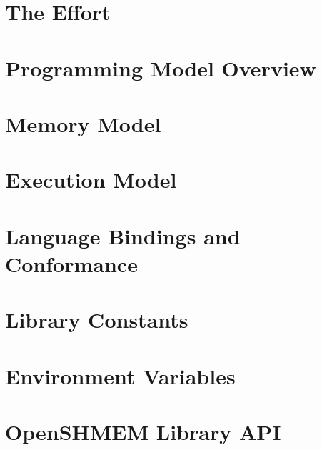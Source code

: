 \documentclass[10pt]{book}
\begin{document}




\section{The \openshmem Effort}\label{subsec:openshmem_effort}


\section{Programming Model Overview}\label{subsec:programming_model}


\section{Memory Model}\label{subsec:memory_model}


\section{Execution Model}\label{subsec:execution_model}


\section{Language Bindings and Conformance}\label{subsec:bindings}


\section{Library Constants}\label{subsec:library_constants}


\section{Environment Variables }\label{subsec:environment_variables}





\clearpage



\section{OpenSHMEM Library API}\label{sec:openshmem_library_api}
\end{document}
